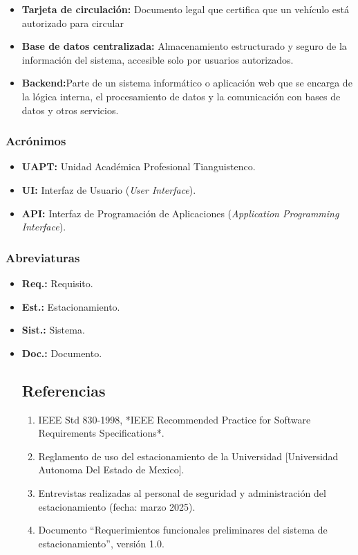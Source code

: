 {\begin{itemize}
\item {\textbf{Tarjeta de circulación:} Documento legal que certifica que un vehículo
	está autorizado para circular}
	\item { \textbf{Base de datos centralizada: }Almacenamiento estructurado y seguro
	de la información del sistema, accesible solo por usuarios autorizados.}
	\item {\textbf{Backend:}Parte de un sistema informático o aplicación web que se encarga de la lógica interna, el procesamiento de datos y la comunicación con bases de datos y otros servicios. }

\end{itemize}


\subsubsection{Acrónimos}
\begin{itemize}
\item { \textbf{UAPT:} Unidad Académica Profesional Tianguistenco.}
\item {\textbf{UI:} Interfaz de Usuario (\emph{User Interface}).}
\item {\textbf{API:} Interfaz de Programación de Aplicaciones (\emph{Application Programming Interface}).}
\end{itemize}
\subsubsection{Abreviaturas}
\begin{itemize}
\item{ \textbf{Req.:} Requisito.}
\item{\textbf{Est.:} Estacionamiento.}
\item{ \textbf{Sist.:} Sistema.}
\item {\textbf{Doc.: } Documento.}
\subsection{Referencias}
\begin{enumerate}
	\item IEEE Std 830-1998, *IEEE Recommended Practice for Software Requirements Specifications*.
	\item Reglamento de uso del estacionamiento de la Universidad [Universidad Autonoma Del Estado de Mexico].
	\item Entrevistas realizadas al personal de seguridad y administración del estacionamiento (fecha: marzo 2025).
	\item Documento “Requerimientos funcionales preliminares del sistema de estacionamiento”, versión 1.0.
\end{enumerate}



\end{itemize}}
